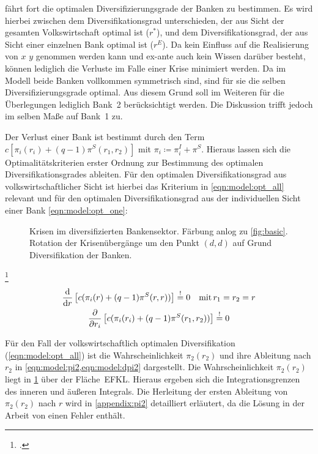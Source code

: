  fährt fort die optimalen Diversifizierungsgrade der Banken zu bestimmen. Es wird hierbei zwischen dem Diversifikationsgrad unterschieden, der aus Sicht der gesamten Volkswirtschaft optimal ist ($r^\ast$), und dem Diversifikationsgrad, der aus Sicht einer einzelnen Bank optimal ist ($r^E$). Da kein Einfluss auf die Realisierung von $x$ \bzw{} $y$ genommen werden kann und ex-ante auch kein Wissen darüber besteht, können lediglich die Verluste im Falle einer Krise minimiert werden. Da im Modell beide Banken vollkommen symmetrisch sind, sind für sie die selben Diversifizierungsgrade optimal.  Aus diesem Grund soll im Weiteren für die Überlegungen lediglich Bank~2 berücksichtigt werden. Die Diskussion trifft jedoch im selben Maße auf Bank~1 zu.

Der Verlust einer Bank ist bestimmt durch den Term $c\left[\pi_i(r_i) + (q-1)\pi^S(r_1,r_2)\right]$ mit $\pi_i\!\coloneqq\!\pi^I_i + \pi^S$. Hieraus lassen sich die Optimalitätskriterien erster Ordnung zur Bestimmung des optimalen Diversifikationsgrades ableiten. Für den optimalen Diversifikationsgrad aus volkswirtschaftlicher Sicht ist hierbei das Kriterium in \cref{eqn:model:opt_all} relevant und für den optimalen Diversifikationsgrad aus der individuellen Sicht einer Bank \cref{eqn:model:opt_one}:

\begin{figure}[t!]\centering
	\caption[Krisen im diversifizierten Bankensektor.]{Krisen im diversifizierten Bankensektor\footnotemark. Färbung anlog zu \cref{fig:basic}. Rotation der Krisenübergänge um den Punkt $(d,d)$ auf Grund Diversifikation der Banken.}%
	\label{fig:divers}
\end{figure}
\footcitetext[nach][\pno~378(6), Fig.~2]{Wagner-2010}

\vspace{-0.75cm}
\begin{gather}
	\displaystyle \dv{r} \left[ c(\pi_i(r) + (q-1)\pi^{S}(r,r)) \right] \overset{!}{=} 0 \quad \text{mit}\,r_1=r_2=r \label{eqn:model:opt_all} \\
	\displaystyle \pdv{r_i} \left[ c(\pi_i(r_i) + (q-1)\pi^{S}(r_1,r_2)) \right] \overset{!}{=} 0                    \label{eqn:model:opt_one}
\end{gather}

Für den Fall der volkswirtschaftlich optimalen Diversifikation (\cref{eqn:model:opt_all}) ist die Wahrscheinlichkeit $\pi_2(r_2)$ und ihre Ableitung nach $r_2$ in \cref{eqn:model:pi2,eqn:model:dpi2} dargestellt. Die Wahrscheinlichkeit $\pi_2(r_2)$ liegt in \cref{fig:divers} über der Fläche~EFKL. Hieraus ergeben sich die Integrationsgrenzen des inneren und äußeren Integrals. Die Herleitung der ersten Ableitung von $\pi_2(r_2)$ nach $r$ wird in \cref{appendix:pi2} detailliert erläutert, da die Lösung in der Arbeit von \citeauthor{Wagner-2010} einen Fehler enthält.


